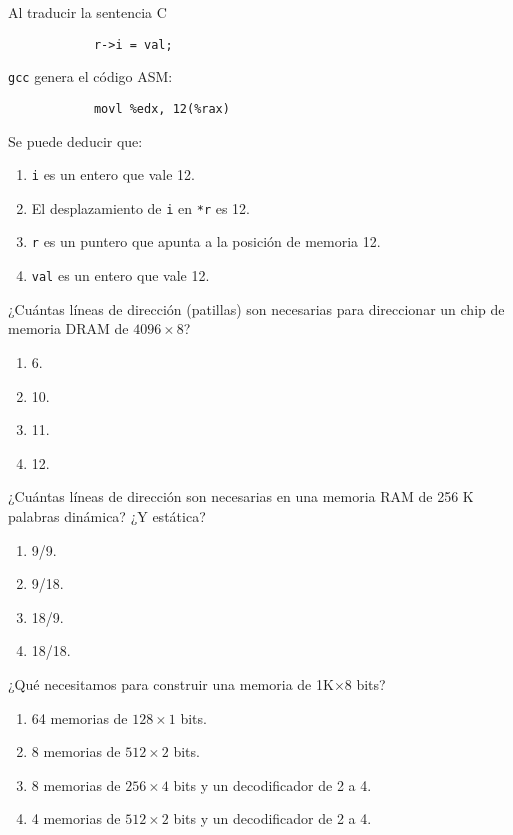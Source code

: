 \documentclass[12pt]{article}
\begin{document}
    \begin{ejercicio}
        Al traducir la sentencia C
        \begin{verbatim}
            r->i = val;
        \end{verbatim}
        \verb|gcc| genera el código ASM:
        \begin{verbatim}
            movl %edx, 12(%rax)
        \end{verbatim}
        Se puede deducir que:
        \begin{enumerate}[label=\alph*)]
            \item \verb|i| es un entero que vale 12.
            \item El desplazamiento de \verb|i| en \verb|*r| es 12.
            \item \verb|r| es un puntero que apunta a la posición de memoria 12.
            \item \verb|val| es un entero que vale 12.
        \end{enumerate}
    \end{ejercicio}
    \begin{ejercicio}
        ¿Cuántas líneas de dirección (patillas) son necesarias para direccionar un chip de memoria DRAM de $4096\times 8$?
        \begin{enumerate}[label=\alph*)]
            \item 6.
            \item 10.
            \item 11.
            \item 12.
        \end{enumerate}
    \end{ejercicio}
    \begin{ejercicio}
        ¿Cuántas líneas de dirección son necesarias en una memoria RAM de 256 K palabras dinámica? ¿Y estática?
        \begin{enumerate}[label=\alph*)]
            \item 9/9.
            \item 9/18.
            \item 18/9.
            \item 18/18.
        \end{enumerate}
    \end{ejercicio}
    \begin{ejercicio}
        ¿Qué necesitamos para construir una memoria de 1K$\times 8$ bits?
        \begin{enumerate}[label=\alph*)]
            \item 64 memorias de $128\times 1$ bits.
            \item 8 memorias de $512\times 2$ bits.
            \item 8 memorias de $256\times 4$ bits y un decodificador de 2 a 4.
            \item 4 memorias de $512\times 2$ bits y un decodificador de 2 a 4.
        \end{enumerate}
    \end{ejercicio}
\end{document}

